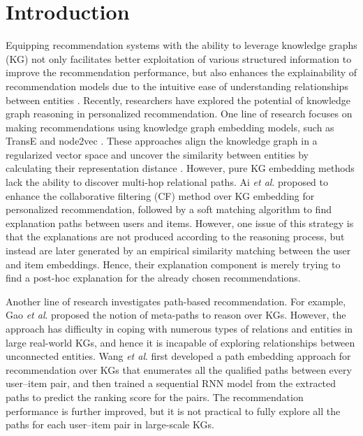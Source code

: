 \documentclass[sigconf]{acmart}
\newcommand{\etal}{\textit{et al}. }
\begin{document}



\maketitle


\section{Introduction}\label{sec:intro}


Equipping recommendation systems with the ability to leverage knowledge graphs (KG) not only facilitates better exploitation of various structured information to improve the recommendation performance, but also enhances the explainability of recommendation models due to the intuitive ease of understanding relationships between entities \cite{zhang2018explainable}. Recently, researchers have explored the potential of knowledge graph reasoning in personalized recommendation.
One line of research focuses on making recommendations using knowledge graph embedding models, such as TransE \cite{bordes2013translating} and node2vec \cite{grover2016node2vec}.
These approaches align the knowledge graph in a regularized vector space and uncover the similarity between entities by calculating their representation distance \cite{zhang2016collaborativekdd}. However, pure KG embedding methods lack the ability to discover multi-hop relational paths.
Ai \etal \cite{ai2018learning} proposed to enhance the collaborative filtering (CF) method over KG embedding for personalized recommendation, followed by a soft matching algorithm to find explanation paths between users and items.
However, one issue of this strategy is that the explanations are not produced according to the reasoning process, but instead are later generated by an empirical similarity matching between the user and item embeddings. Hence, their explanation component is merely trying to find a post-hoc explanation for the already chosen recommendations.

Another line of research investigates path-based recommendation.
For example, Gao \etal \cite{gao2018recommendation} proposed the notion of meta-paths to reason over KGs. However, the approach has difficulty in coping with numerous types of relations and entities in large real-world KGs, and hence it is incapable of exploring relationships between unconnected entities.
Wang \etal \cite{wang2018explainable} first developed a path embedding approach for recommendation over KGs that enumerates all the qualified paths between every user--item pair, and then trained a sequential RNN model from the extracted paths to predict the ranking score for the pairs. The recommendation performance is further improved, but it is not practical to fully explore all the paths for each user--item pair in large-scale KGs.
\end{document}
